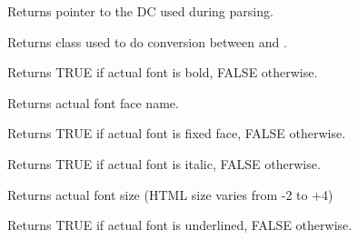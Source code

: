 \label{wxhtmlwinparsergetdc}


Returns pointer to the DC used during parsing.

\label{wxhtmlwinparsergetencodingconverter}


Returns  class used
to do conversion between  
and .

\label{wxhtmlwinparsergetfontbold}


Returns TRUE if actual font is bold, FALSE otherwise.

\label{wxhtmlwinparsergetfontface}


Returns actual font face name.

\label{wxhtmlwinparsergetfontfixed}


Returns TRUE if actual font is fixed face, FALSE otherwise.

\label{wxhtmlwinparsergetfontitalic}


Returns TRUE if actual font is italic, FALSE otherwise.

\label{wxhtmlwinparsergetfontsize}


Returns actual font size (HTML size varies from -2 to +4)

\label{wxhtmlwinparsergetfontunderlined}


Returns TRUE if actual font is underlined, FALSE otherwise.

\label{wxhtmlwinparsergetinputencoding}

